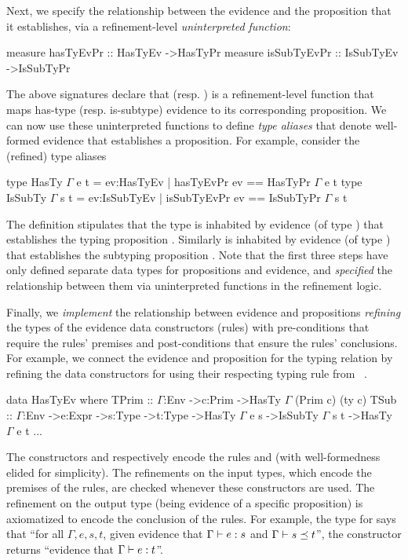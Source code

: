 %
Next, we specify the relationship between the evidence and the proposition
that it establishes, via a refinement-level \emph{uninterpreted function}:
%
\begin{mcode}
  measure hasTyEvPr   :: HasTyEv ->HasTyPr
  measure isSubTyEvPr :: IsSubTyEv ->IsSubTyPr
\end{mcode}
%
The above signatures declare that  (resp. )
is a refinement-level function that maps has-type (resp. is-subtype)
evidence to its corresponding proposition.
%
We can now use these uninterpreted functions to define \emph{type aliases}
that denote well-formed evidence that establishes a proposition.
%
For example, consider the (refined) type aliases
%
\begin{mcode}
  type HasTy   $\Gamma$ e t = {ev:HasTyEv   | hasTyEvPr ev == HasTyPr $\Gamma$ e t }
  type IsSubTy $\Gamma$ s t = {ev:IsSubTyEv | isSubTyEvPr ev == IsSubTyPr $\Gamma$ s t }
\end{mcode}
%
The definition stipulates that the type 
is inhabited by evidence (of type ) that
establishes the typing proposition .
%
Similarly  is inhabited by evidence
(of type ) that establishes the subtyping
proposition .
%
Note that the first three steps have only defined separate data types
for propositions and evidence, and \emph{specified} the relationship
between them via uninterpreted functions in the refinement logic.

%
Finally, we \emph{implement} the relationship between
evidence and propositions \emph{refining} the types of the evidence
data constructors (rules) with pre-conditions that require
the rules' premises and post-conditions that ensure
the rules' conclusions.
%
For example, we connect the evidence and proposition for the
typing relation by refining the data constructors for 
using their respecting typing rule
from ~.
%
\begin{mcode}
  data HasTyEv where
    TPrim :: $\Gamma$:Env ->c:Prim ->HasTy $\Gamma$ (Prim c) (ty c)
    TSub  :: $\Gamma$:Env ->e:Expr ->s:Type ->t:Type 
          ->HasTy $\Gamma$ e s ->IsSubTy $\Gamma$ s t ->HasTy $\Gamma$ e t
    ...
\end{mcode}
%
The constructors  and  respectively
encode the rules \tPrim and \tSub (with 
well-formedness elided for simplicity).
%
The refinements on the input types, 
which encode the premises of the rules,
are checked whenever these constructors are used. 
The refinement on the 
output type (being evidence of a specific proposition)
is axiomatized to encode the conclusion of the rules.
%
For example, the type for 
says that ``for all $\Gamma, e, s, t$,
given evidence that ${\Gamma} \vdash {e} : {s}$ and ${\Gamma} \vdash s \preceq t$'',
the constructor returns ``evidence that ${\Gamma} \vdash {e} : {t}$''.

